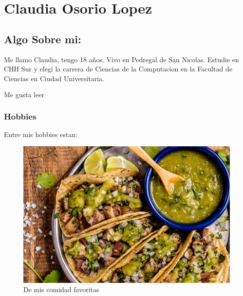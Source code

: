 \chapter{Claudia Osorio Lopez}

\section{Algo Sobre mi:}
Me llamo Claudia, tengo 18 años. Vivo en Pedregal de San Nicolas. Estudie en CHH Sur y elegi la carrera de Ciencias de la Computacion en la Facultad de Ciencias en Ciudad Universitaria.

Me gusta leer~\cite{Floodlight,Tokuyama}


\subsection{Hobbies}
Entre mis hobbies estan:
\begin{enumerate}
  \item{Escuchar Musica
  \item{Leer
  \item{Limpiar
  \item[Caminar
\end{enumerate}

\begin{figure}[h]
  \centering
  \includegraphics[scale=0.2]{IMG/tacos.jpg}
  \caption{De mis comidad favoritas}
  \label{fig:tacos}
\end{figure}
